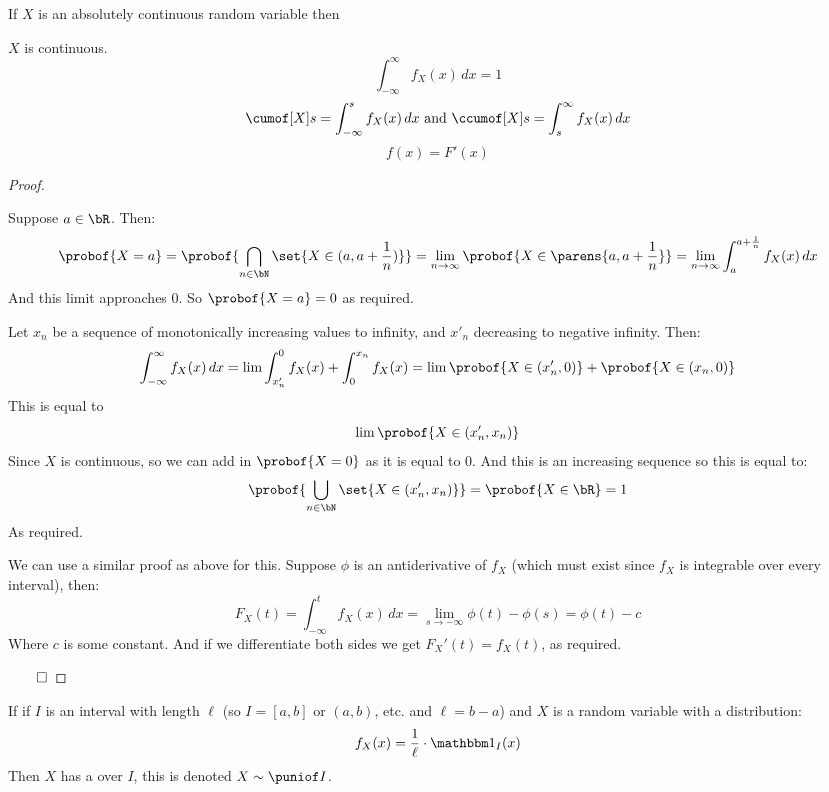 \begin{prop*}

	If $X$ is an absolutely continuous random variable then
	\begin{msecenumerate}
		\mitem $X$ is continuous.
		\mitem \[ \int_{-\infty}^\infty f_X(x)\,dx = 1 \]
		\mitem \[ \cumof[X]s = \int_{-\infty}^s f_X(x)\,dx \text{ and } \ccumof[X]s = \int_s^\infty f_X(x)\,dx \]
		\mitem \[ f(x) = F'(x) \]
	\end{msecenumerate}

\end{prop*}

\begin{proof}

	\begin{msecenumerate}[0pt]
		\mitem Suppose $a\in\bR$.
			Then:
			\[ \probof{X=a} = \probof{\bigcap_{n\in\bN}\set{X\in(a,a+\frac1n)}} = \lim_{n\to\infty}\probof{X\in\parens{a,a+\frac1n}} =
			\lim_{n\to\infty}\int_a^{a+\frac1n}f_X(x)\,dx \]
			And this limit approaches $0$.
			So $\probof{X=a}=0$ as required.

		\mitem Let $x_n$ be a sequence of monotonically increasing values to infinity, and $x'_n$ decreasing to negative infinity.
			Then:
			\[ \int_{-\infty}^\infty f_X(x)\,dx = \lim \int_{x'_n}^0 f_X(x) + \int_0^{x_n} f_X(x) = \lim \probof{X\in(x'_n,0)} + \probof{X\in(x_n,0)} \]
			This is equal to
			\[ \lim\probof{X\in(x'_n,x_n)} \]
			Since $X$ is continuous, so we can add in $\probof{X=0}$ as it is equal to $0$.
			And this is an increasing sequence so this is equal to:
			\[ \probof{\bigcup_{n\in\bN}\set{X\in(x'_n,x_n)}} = \probof{X\in\bR} = 1 \]
			As required.

		\mitem We can use a similar proof as above for this.
		\mitem Suppose $\phi$ is an antiderivative of $f_X$ (which must exist since $f_X$ is integrable over every interval), then:
			\[ F_X(t) = \int_{-\infty}^t f_X(x)\,dx = \lim_{s\to-\infty}\phi(t)-\phi(s) = \phi(t) - c \]
			Where $c$ is some constant.
			And if we differentiate both sides we get $F_X'(t)=f_X(t)$, as required.
	\end{msecenumerate}

	\hfill$\qed$

\end{proof}

\begin{defn*}

	If if $I$ is an interval with length $\ell$ (so $I=[a,b]$ or $(a,b)$, etc. and $\ell=b-a$) and $X$ is a random variable with a distribution:
	\[ f_X(x) = \frac1\ell\cdot\bone_{I}(x) \]
	Then $X$ has a  over $I$, this is denoted $X\sim\puniof I$.

\end{defn*}


